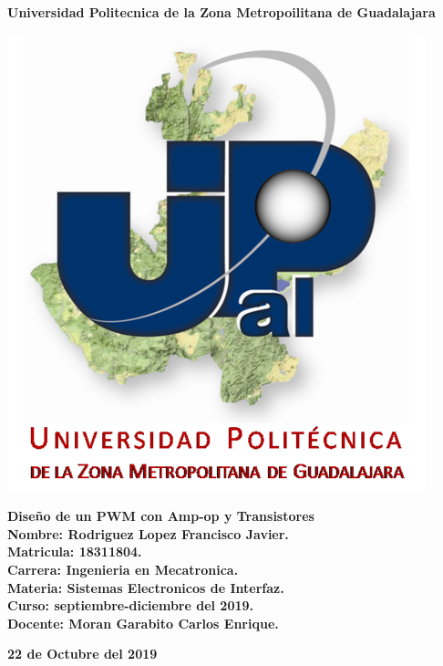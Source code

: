 \documentclass[12pt,a4paper]{article}
\author{Rodriguez Lopez Francisco Javier}
\begin{document}
\begin{center}
\LARGE \textbf{Universidad Politecnica de la Zona Metropoilitana de Guadalajara\\}


\includegraphics[scale=1]{Upzmg6.png} 

\large \textbf{Diseño de un PWM con Amp-op y Transistores}\\
\vspace{2cm}
\large \textbf{Nombre: Rodriguez Lopez Francisco Javier.\\
\vspace{0.5cm} Matricula: 18311804.\\
\vspace{0.5cm} Carrera: Ingenieria en Mecatronica.\\
\vspace{0.5cm} Materia: Sistemas Electronicos de Interfaz.\\
\vspace{0.5cm} Curso: septiembre-diciembre del 2019.\\
\vspace{0.5cm} Docente: Moran Garabito Carlos Enrique.}


\vspace{6cm}
\small \textbf{22 de Octubre del 2019}
\end{center}
\end{document}
